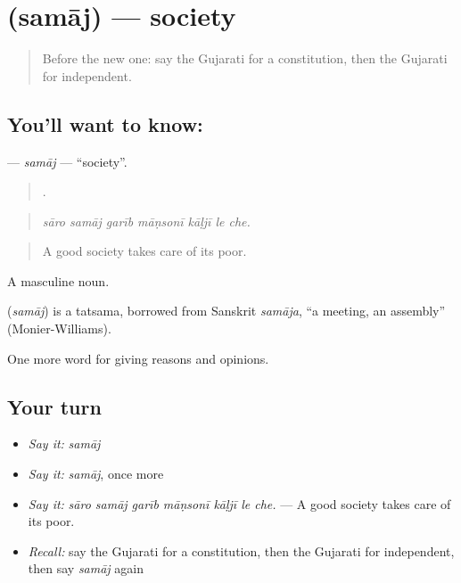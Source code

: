 \section[\texorpdfstring{\gu{સમાજ} (samāj)}{સમાજ (samāj)}]{ (samāj) — society}

\label{lesson:GU-C356-samaj}



\begin{quote}
Before the new one: say the Gujarati for a constitution, then the Gujarati for independent.
\end{quote}

\subsection*{You'll want to know: }
\textbf{} — \emph{samāj} — \textquotedblleft{}society\textquotedblright{}.

\begin{quote}
      .
\end{quote}

\begin{quote}
\emph{sāro samāj garīb māṇsonī kāḷjī le che.}
\end{quote}

\begin{quote}
A good society takes care of its poor.
\end{quote}

A masculine noun.

\begin{cousinweb}
\textbf{} (\emph{samāj}) is a tatsama, borrowed from Sanskrit \emph{samāja}, \textquotedblleft{}a meeting, an assembly\textquotedblright{} (Monier-Williams).
\end{cousinweb}

\begin{grammarlens}[title={What you've built}]
One more word for giving reasons and opinions.
\end{grammarlens}

\subsection*{Your turn}
\begin{itemize}
\raggedright
  \item \emph{Say it:} \emph{samāj}
  \item \emph{Say it:} \emph{samāj}, once more
  \item \emph{Say it:} \emph{sāro samāj garīb māṇsonī kāḷjī le che.} — A good society takes care of its poor.
  \item \emph{Recall:} say the Gujarati for a constitution, then the Gujarati for independent, then say \emph{samāj} again
\end{itemize}

